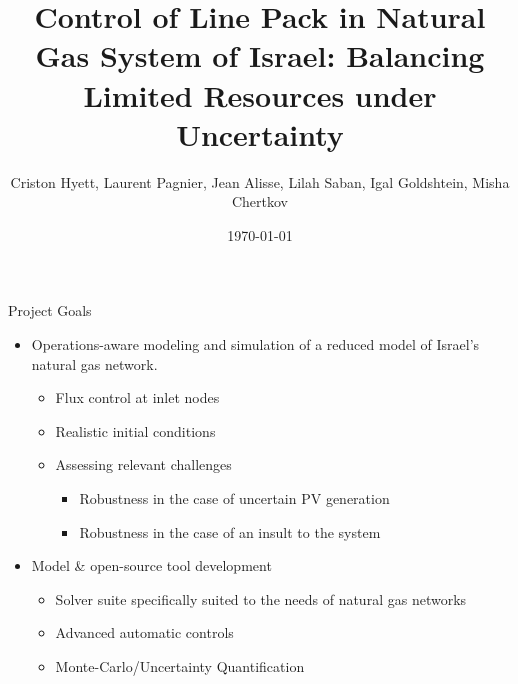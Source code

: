 \documentclass[aspectratio=1610,12pt,dvipsnames]{beamer}
\date{\today}
\newcommand{\<}{\langle}
\renewcommand{\>}{\rangle}
\begin{document}

\title[Control of Line Pack in Natural Gas System of Israel]{Control of Line Pack in Natural Gas System of Israel:
Balancing Limited Resources under Uncertainty}
\author[Hyett, Pagnier, Alisse, Saban, Goldshtein, Chertkov]{Criston Hyett, Laurent Pagnier, Jean Alisse, Lilah Saban, Igal Goldshtein, Misha Chertkov}


\graphicspath{{./NOGA-UA-gas/figs/}}
\begin{frame}
  \maketitle
\end{frame}


\begin{frame}{Project Goals}
  \begin{itemize}
  \item Operations-aware modeling and simulation of a reduced model of Israel's natural gas network.
    \begin{itemize}
    \item Flux control at inlet nodes
    \item Realistic initial conditions
    \item Assessing relevant challenges
      \begin{itemize}
      \item Robustness in the case of uncertain PV generation
      \item Robustness in the case of an insult to the system
      \end{itemize}
    \end{itemize}

  \item Model \& open-source tool development
    \begin{itemize}
    \item Solver suite specifically suited to the needs of natural gas networks
    \item Advanced automatic controls
    \item Monte-Carlo/Uncertainty Quantification
    \end{itemize}
  \end{itemize}
\end{frame}
\end{document}
